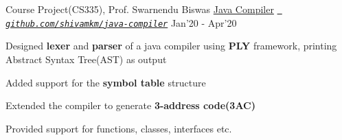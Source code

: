\begin{cventries}
	
	  \cventry
	  {Course Project(CS335), Prof. Swarnendu Biswas}
	  {\href{https://github.com/shivamkm/java-compiler}{Java Compiler} }
	  {\emph{\texttt{\href{https://github.com/shivamkm/java-compiler}{ github.com/shivamkm/java-compiler}}}}
	  {Jan'20 - Apr'20}
	  {
	    \begin{cvitems}
	      \item Designed \textbf{lexer} and \textbf{parser} of a java compiler using \textbf{PLY} framework, printing Abstract Syntax Tree(AST) as output
	      \item Added support for the \textbf{symbol table} structure
	      \item Extended the compiler to generate \textbf{3-address code(3AC)}
	      \item Provided support for 
	      functions, classes, interfaces etc.
	    \end{cvitems}
	  }
	

\end{cventries}
